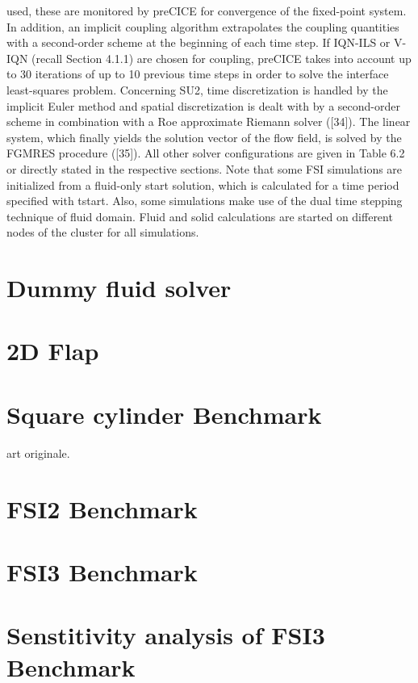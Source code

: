 used, these are monitored by preCICE for convergence of the fixed-point system. In addition, an implicit
coupling algorithm extrapolates the coupling quantities with a second-order scheme at the beginning of
each time step. If IQN-ILS or V-IQN (recall Section 4.1.1) are chosen for coupling, preCICE takes into
account up to 30 iterations of up to 10 previous time steps in order to solve the interface least-squares
problem.
Concerning SU2, time discretization is handled by the implicit Euler method and spatial discretization is
dealt with by a second-order scheme in combination with a Roe approximate Riemann solver ([34]). The
linear system, which finally yields the solution vector of the flow field, is solved by the FGMRES procedure
([35]). All other solver configurations are given in Table 6.2 or directly stated in the respective sections.
Note that some FSI simulations are initialized from a fluid-only start solution, which is calculated for a
time period specified with tstart. Also, some simulations make use of the dual time stepping technique of
fluid domain.
Fluid and solid calculations are started on different nodes of the cluster for all simulations.



\section{Dummy fluid solver}


\section{2D Flap}


\section{Square cylinder Benchmark}


\cite{ramm1998fluid} art originale.
\cite{walhorn2002space}
\cite{matthies2003partitioned}
\cite{dettmer2006computational}
\cite{olivier2009fluid}
\cite{wood2010partitioned}
\cite{kassiotis2011nonlinear}
\cite{habchi2013partitioned}
\cite{froehle2014high}


\section{FSI2 Benchmark}



\section{FSI3 Benchmark}


\section{Senstitivity analysis of FSI3 Benchmark}




